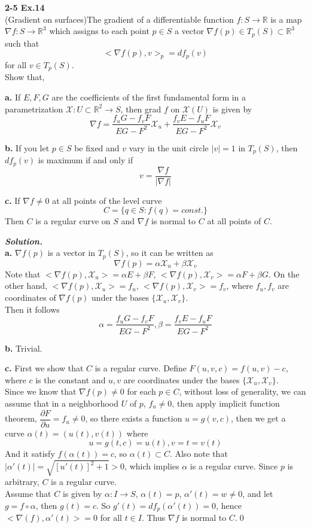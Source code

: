 \documentclass{article}
\begin{document}
\par
\textbf{2-5 Ex.14}\\
(Gradient on surfaces)The gradient of a 
differentiable function $f:S \to \mathbb{R}$ is a map
$\nabla f: S \to \mathbb{R}^3$ which assigns to each point
$p \in S$ a vector $\nabla f(p) \in T_p(S) \subset \mathbb{R}^3$
such that
$$
    <\nabla f(p), v>_p = df_p(v)
$$
for all $v \in T_p(S)$. \\
Show that,
\par
\textbf{a. }If $E,F,G$ are the coefficients of the first
fundamental form in a parametrization 
$\mathcal{X}: U \subset \mathbb{R}^2 \to S$, then
grad $f$ on $\mathcal{X}(U)$ is given by
$$
    \nabla f = \frac{f_uG-f_vF}{EG-F^2}\mathcal{X}_u + \frac{f_vE-f_uF}{EG-F^2}\mathcal{X}_v
$$

\par
\textbf{b. }If you let $p \in S$ be fixed and $v$ vary in 
the unit circle $|v|=1$ in $T_p(S)$, then $df_p(v)$ is 
maximum if and only if
$$
    v = \frac{\nabla f}{|\nabla f|}
$$

\par
\textbf{c. }If $\nabla f \neq 0$ at all points of the
level curve
$$
    C = \{q \in S: f(q)=const.\}
$$
Then $C$ is a regular curve on $S$ and $\nabla f$ is normal
to $C$ at all points of $C$.

\par
\textbf{\textit{Solution.}}\\
\textbf{a. }$\nabla f(p)$ is a vector in $T_p(S)$, so it
can be written as
$$
    \nabla f(p) = \alpha \mathcal{X}_u + \beta \mathcal{X}_v
$$
Note that $<\nabla f(p), \mathcal{X}_u> = \alpha E + \beta F$, 
$<\nabla f(p), \mathcal{X}_v> = \alpha F + \beta G$.
On the other hand,
$<\nabla f(p), \mathcal{X}_u> = f_u$, 
$<\nabla f(p), \mathcal{X}_v> = f_v$, where $f_u,f_v$
are coordinates of $\nabla f(p)$ under the bases $\{\mathcal{X}_u, \mathcal{X}_v\}$.\\
Then it follows
$$
\alpha= \frac{f_uG-f_vF}{EG-F^2}, \beta=\frac{f_vE-f_uF}{EG-F^2}
$$

\par
\textbf{b. }Trivial.

\par
\textbf{c. }First we show that $C$ is a regular curve.
Define $F(u,v,c)=f(u,v)-c$, where $c$ is the constant and 
$u,v$ are coordinates under the bases 
$\{\mathcal{X}_u, \mathcal{X}_v\}$.\\
Since we know that $\nabla f(p) \neq 0$ for each $p \in C$,
without loss of generality, we can assume that in a neighborhood
$U$ of $p$, $f_u \neq 0$, then apply implicit function theorem,
$\dfrac{\partial{F}}{\partial{u}} = f_u \neq 0$, so there exists
a function $u = g(v, c)$, then we get a curve $\alpha(t) = (u(t), v(t))$
where
$$
    u = g(t,c)=u(t), v=t=v(t)
$$
And it satisfy $f(\alpha(t)) = c$, so $\alpha(t) \subset C$.
Also note that $|\alpha'(t)|=\sqrt{[u'(t)]^2 + 1} > 0$, which
implies $\alpha$ is a regular curve. Since
$p$ is arbitrary, $C$ is a regular curve.\\
Assume that $C$ is given by $\alpha: I \to S$, 
$\alpha(t)=p$, $\alpha'(t)=w \neq 0$, and let
$g = f \circ \alpha$, then $g(t) = c$. So 
$g'(t)=df_p(\alpha'(t)) = 0$, hence $<\nabla(f), \alpha'(t)>=0$
for all $t \in I$. Thus $\nabla f$ is normal to $C$.\qed
\end{document}

